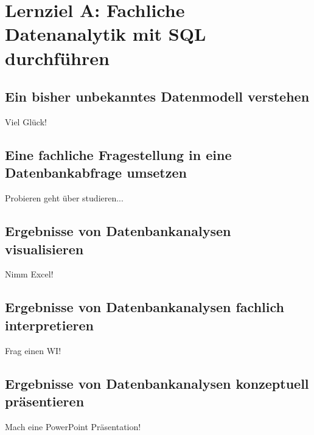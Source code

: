 \section{Lernziel A: Fachliche Datenanalytik mit SQL durchführen}

\subsection{Ein bisher unbekanntes Datenmodell verstehen}

Viel Glück!

\subsection{Eine fachliche Fragestellung in eine Datenbankabfrage umsetzen}

Probieren geht über studieren...

\subsection{Ergebnisse von Datenbankanalysen visualisieren}

Nimm Excel!

\subsection{Ergebnisse von Datenbankanalysen fachlich interpretieren}

Frag einen WI!

\subsection{Ergebnisse von Datenbankanalysen konzeptuell präsentieren}

Mach eine PowerPoint Präsentation!